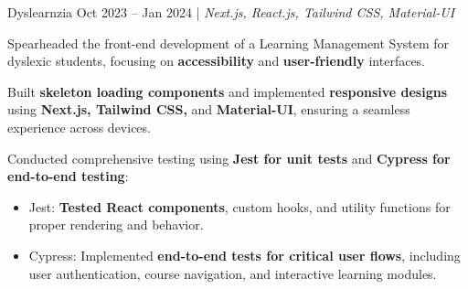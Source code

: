 

        \resumeSubheadings
        {Dyslearnzia }{Oct 2023 -- Jan 2024}
        {}{}{| \textit{Next.js, React.js, Tailwind CSS, Material-UI}}
        \resumeItemListStart
        \item Spearheaded the front-end development of a Learning Management System for dyslexic students, focusing on \textbf{accessibility} and \textbf{user-friendly} interfaces.
        \item Built \textbf{skeleton loading components} and implemented \textbf{responsive designs} using \textbf{Next.js, Tailwind CSS,} and \textbf{Material-UI}, ensuring a seamless experience across devices.
        \item Conducted comprehensive testing using \textbf{Jest for unit tests} and \textbf{Cypress for end-to-end testing}:
          \begin{itemize}
            \item Jest: \textbf{Tested React components}, custom hooks, and utility functions for proper rendering and behavior.
            \item Cypress: Implemented \textbf{end-to-end tests for critical user flows}, including user authentication, course navigation, and interactive learning modules.
          \end{itemize}
        \resumeItemListEnd